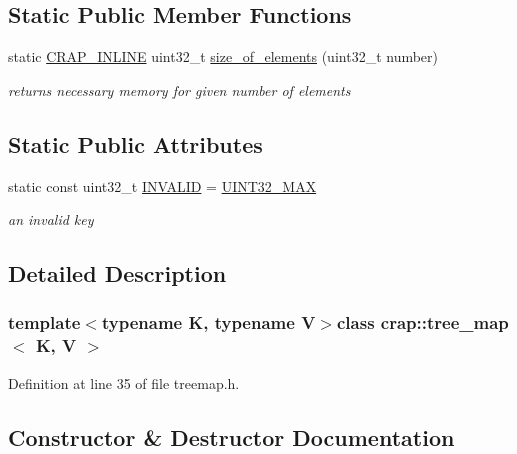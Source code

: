\subsection*{Static Public Member Functions}
\begin{DoxyCompactItemize}
\item 
static \hyperlink{config__x86_8h_a5a40526b8d842e7ff731509998bb0f1c}{C\+R\+A\+P\+\_\+\+I\+N\+L\+I\+N\+E} uint32\+\_\+t \hyperlink{classcrap_1_1tree__map_a3e4f7f3bc27339ca317f1753badc3ba7}{size\+\_\+of\+\_\+elements} (uint32\+\_\+t number)
\begin{DoxyCompactList}\small\item\em returns necessary memory for given number of elements \end{DoxyCompactList}\end{DoxyCompactItemize}
\subsection*{Static Public Attributes}
\begin{DoxyCompactItemize}
\item 
static const uint32\+\_\+t \hyperlink{classcrap_1_1tree__map_a56839c4c0ac1ec3167db293f2b31382f}{I\+N\+V\+A\+L\+I\+D} = \hyperlink{crap__types_8h_ab5eb23180f7cc12b7d6c04a8ec067fdd}{U\+I\+N\+T32\+\_\+\+M\+A\+X}
\begin{DoxyCompactList}\small\item\em an invalid key \end{DoxyCompactList}\end{DoxyCompactItemize}


\subsection{Detailed Description}
\subsubsection*{template$<$typename K, typename V$>$class crap\+::tree\+\_\+map$<$ K, V $>$}



Definition at line 35 of file treemap.\+h.



\subsection{Constructor \& Destructor Documentation}
\hypertarget{classcrap_1_1tree__map_a6a4a68fa3fb61c3d9d97e1575a638736}{}
